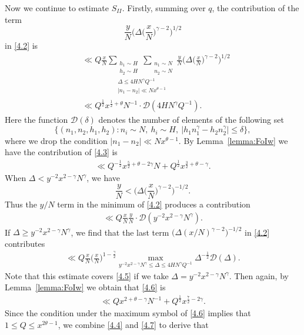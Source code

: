 \documentclass[12pt, reqno, twoside, letterpaper]{amsart}
\numberwithin{equation}{section}
\newcommand{\cD}{\ensuremath{\mathcal{D}}}
\theoremstyle{customthm}
\theoremstyle{customrem}
\begin{document}
Now we continue to estimate $S_{II}$. Firstly, summing over $q$, the contribution of the term 
$$
\frac{y}{N}\Big(\Delta\big( \frac{x}{N} \big)^{\gamma-2}\Big)^{1/2}
$$
in \eqref{4.2} is
\begin{align}\label{4.3}
\nonumber
&\ll Q\frac{x}{N} \underset{\substack{\Delta \leqslant 4HN^{\gamma}Q^{-1} \\ |n_1-n_2| \ll Nx^{\theta-1}}}{\sum_{\substack{h_1 \sim H \\ h_2 \sim H}} \sum_{\substack{n_1 \sim N \\ n_2 \sim N}}} \frac{y}{N}\Big(\Delta\big( \frac{x}{N} \big)^{\gamma-2}\Big)^{1/2} \\
&\ll Q^{\frac{1}{2}}x^{\frac{1}{2}+\theta}N^{-1} \cdot \cD(4HN^{\gamma}Q^{-1}).
\end{align}	
Here the function $\cD(\delta)$ denotes the number of elements of the following set
$$
\{(n_1,n_2,h_1,h_2):n_i \sim N, \ h_i \sim H, \ \big| h_1n^\gamma_1 - h_2n^\gamma_2 \big| \leqslant \delta\},
$$
where we drop the condition $|n_1-n_2| \ll Nx^{\theta-1}$. By Lemma~\ref{lemma:FoIw} we have the contribution of \eqref{4.3} is
\begin{align}\label{4.4}
\ll Q^{-\frac{1}{2}}x^{\frac{5}{2}+\theta-2\gamma}N + Q^{\frac{1}{2}}x^{\frac{3}{2}+\theta -\gamma}.
\end{align}
When $\Delta < y^{-2}x^{2-\gamma}N^{\gamma}$, we have 
$$
\frac{y}{N} < \Big(\Delta\big( \frac{x}{N} \big)^{\gamma-2}\Big)^{-1/2}.
$$ 
Thus the $y/N$ term in the minimum of \eqref{4.2} produces a contribution
\begin{align}\label{4.5}
\ll Q\frac{x}{N} \frac{y}{N} \cdot \cD(y^{-2}x^{2-\gamma}N^{\gamma}).
\end{align}
If $\Delta \geqslant y^{-2}x^{2-\gamma}N^{\gamma}$, we find that the last term $\big(\Delta(x/N)^{\gamma-2}\big)^{-1/2}$ in \eqref{4.2} contributes
\begin{align}\label{4.6}
\ll Q\frac{x}{N} \big( \frac{x}{N} \big)^{1-\frac{\gamma}{2}} \max_{y^{-2}x^{2-\gamma}N^{\gamma} \leqslant \Delta \leqslant 4HN^{\gamma}Q^{-1}} \Delta^{-\frac{1}{2}} \cD(\Delta).
\end{align}
Note that this estimate covers \eqref{4.5} if we take $\Delta = y^{-2}x^{2-\gamma}N^{\gamma}$. Then again, by Lemma~\ref{lemma:FoIw} we obtain that \eqref{4.6} is
\begin{align}\label{4.7}
\ll Qx^{2+\theta-\gamma}N^{-1} + Q^{\frac{1}{2}}x^{\frac{7}{2}-2\gamma}.
\end{align}
Since the condition under the maximum symbol of \eqref{4.6} implies that $1\leqslant Q \leqslant x^{2\theta -1}$, we combine \eqref{4.4} and \eqref{4.7} to derive that
\end{document}
